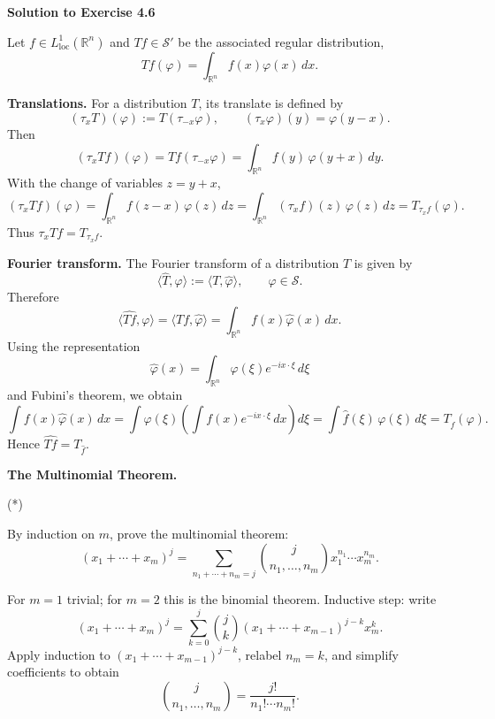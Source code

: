 \begin{solution}

\par\medskip\noindent\textbf{Solution to Exercise 4.6}\par\smallskip


Let $f\in L^{1}_{\mathrm{loc}}(\mathbb{R}^n)$ and $Tf\in\mathcal{S}'$ be the
associated regular distribution,
\[
Tf(\varphi) = \int_{\mathbb{R}^n} f(x)\varphi(x)\,dx.
\]

\par\medskip\noindent\textbf{Translations.}\quad
For a distribution $T$, its translate is defined by
\[
(\tau_x T)(\varphi) := T(\tau_{-x}\varphi),
\qquad (\tau_x\varphi)(y)=\varphi(y-x).
\]
Then
\[
(\tau_x Tf)(\varphi)
= Tf(\tau_{-x}\varphi)
= \int_{\mathbb{R}^n} f(y)\,\varphi(y+x)\,dy.
\]
With the change of variables $z=y+x$,
\[
(\tau_x Tf)(\varphi)
= \int_{\mathbb{R}^n} f(z-x)\,\varphi(z)\,dz
= \int_{\mathbb{R}^n} (\tau_x f)(z)\,\varphi(z)\,dz
= T_{\tau_x f}(\varphi).
\]
Thus $\tau_x Tf = T_{\tau_x f}$.

\par\medskip\noindent\textbf{Fourier transform.}\quad
The Fourier transform of a distribution $T$ is given by
\[
\langle\widehat{T},\varphi\rangle
:= \langle T,\widehat{\varphi}\rangle,
\qquad \varphi\in\mathcal{S}.
\]
Therefore
\[
\langle\widehat{Tf},\varphi\rangle
= \langle Tf,\widehat{\varphi}\rangle
= \int_{\mathbb{R}^n} f(x)\widehat{\varphi}(x)\,dx.
\]
Using the representation
\[
\widehat{\varphi}(x)
= \int_{\mathbb{R}^n}\varphi(\xi)e^{-ix\cdot\xi}\,d\xi
\]
and Fubini's theorem, we obtain
\[
\int f(x)\widehat{\varphi}(x)\,dx
= \int \varphi(\xi)\left(\int f(x)e^{-ix\cdot\xi}\,dx\right)d\xi
= \int \widehat{f}(\xi)\,\varphi(\xi)\,d\xi
= T_{\widehat{f}}(\varphi).
\]
Hence $\widehat{Tf} = T_{\widehat{f}}$.

\bigskip
\end{solution}

\begin{problem}[CP-II-0128]
\label{prob:cp-ii-0128}
\textbf{The Multinomial Theorem.}

\hspace*{1.5em}(*)

	By induction on $m$, prove the multinomial theorem:
	\[
	(x_1+\cdots+x_m)^j = \sum_{n_1+\cdots+n_m=j}
	\binom{j}{n_1,\dots,n_m} x_1^{n_1}\cdots x_m^{n_m}.
	\]
\end{problem}

\begin{solution}
For $m=1$ trivial; for $m=2$ this is the binomial theorem.
		Inductive step: write
		\[
		(x_1+\cdots+x_m)^j = \sum_{k=0}^j \binom{j}{k}(x_1+\cdots+x_{m-1})^{j-k}x_m^k.
		\]
		Apply induction to $(x_1+\cdots+x_{m-1})^{j-k}$, relabel $n_m=k$, and simplify coefficients to obtain
		\[
		\binom{j}{n_1,\dots,n_m} = \frac{j!}{n_1!\cdots n_m!}.
		\]
\end{solution}

